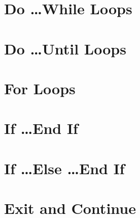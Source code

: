 \section{Do \ldots\protect While Loops}

\section{Do \ldots\protect Until Loops}

\section{For Loops}

\section{If \ldots\protect End If}

\section{If \ldots\protect Else \ldots\protect End If}

\section{Exit and Continue}
